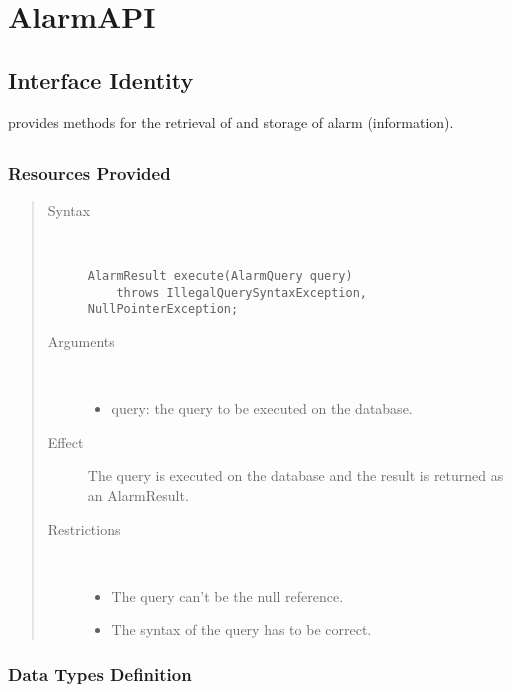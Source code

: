 \section{AlarmAPI}
\label{api:alarm-api}

\subsection{Interface Identity}

\npar {} provides methods for the retrieval of and storage of
alarm (information).

\subsection{}

\subsubsection{Resources Provided}

\begin{quote}
	\begin{description}
		\item[Syntax] \
		\begin{verbatim}
AlarmResult execute(AlarmQuery query)
    throws IllegalQuerySyntaxException, NullPointerException;
		\end{verbatim}
		\item[Arguments] \
		\begin{itemize}
		  \item query: the query to be executed on the database. 
		\end{itemize}
		\item[Effect] The query is executed on the database and the result is returned
		as an AlarmResult. 
		\item[Restrictions] \
		\begin{itemize}
		  \item The query can't be the null reference.
		  \item The syntax of the query has to be correct.
		\end{itemize}
	\end{description} 
\end{quote}

\subsubsection{Data Types Definition}

